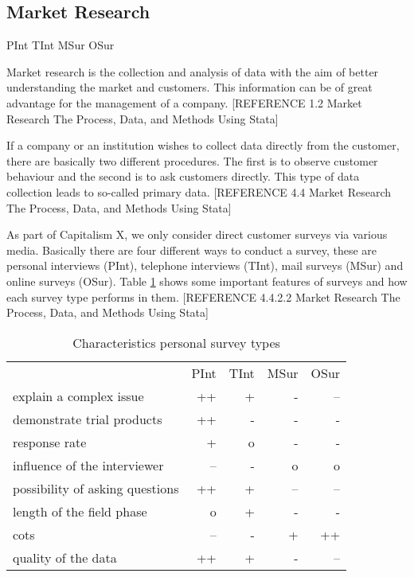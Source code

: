 \subsection{Market Research} \label{market_research_simulation}

\gls{PInt} %
\gls{TInt} %
\gls{MSur} %
\gls{OSur} %

Market research is the collection and analysis of data with the aim of better understanding the market and customers. This information can be of great advantage for the management of a company. [REFERENCE 1.2 Market Research The Process, Data, and Methods Using Stata]

If a company or an institution wishes to collect data directly from the customer, there are basically two different procedures. The first is to observe customer behaviour and the second is to ask customers directly. This type of data collection leads to so-called primary data. [REFERENCE 4.4 Market Research The Process, Data, and Methods Using Stata]

As part of Capitalism X, we only consider direct customer surveys via various media. Basically there are four different ways to conduct a survey, these are personal interviews (PInt), telephone interviews (TInt), mail surveys (MSur) and online surveys (OSur). Table \ref{MR_survey_types_characteristics} shows some important features of surveys and how each survey type performs in them. [REFERENCE 4.4.2.2 Market Research The Process, Data, and Methods Using Stata] 

\begin{table}[ht]
\centering
\begin{tabular}{|l|r|r|r|r|}
\hline
                                & PInt    & TInt    & MSur   & OSur \\
explain a complex issue         & ++    & +     & -    & --  \\
demonstrate trial products      & ++    & -     & -    & -   \\
response rate                   & +     & o     & -    & -   \\
influence of the interviewer    & --    & -     & o    & o   \\
possibility of asking questions & ++    & +     & --   & --  \\
length of the field phase       & o     & +     & -    & -   \\
cots                            & --    & -     & +    & ++  \\
quality of the data             & ++    & +     & -    & --  \\
\hline
\end{tabular}
\caption{Characteristics personal survey types}
\label{MR_survey_types_characteristics}
\end{table}

